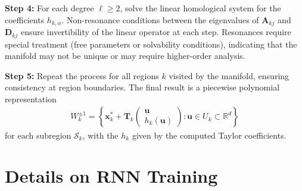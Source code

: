 \documentclass{article}
\theoremstyle{example}
\theoremstyle{plain}
\theoremstyle{definition}
\theoremstyle{remark}
\def\vx{{\bm{x}}}
\def\mA{{\bm{A}}}
\def\mD{{\bm{D}}}
\def\mT{{\bm{T}}}
\begin{document}
\textbf{Step 4:} For each degree $\ell \ge 2$, solve the linear homological system for the coefficients $h_{k,\alpha}$. Non-resonance conditions between the eigenvalues of $\mA_{kj}$ and $\mD_{kj}$ ensure invertibility of the linear operator at each step. Resonances require special treatment (free parameters or solvability conditions), indicating that the manifold may not be unique or may require higher-order analysis.

\textbf{Step 5:} Repeat the process for all regions $k$ visited by the manifold, ensuring consistency at region boundaries. The final result is a piecewise polynomial representation
\begin{align}
W^{\pm1}_k = \left\{ \vx_k^* + \mT_k \begin{pmatrix} \bm{u} \\ h_k(\bm{u}) \end{pmatrix} : \bm{u} \in U_k \subset \mathbb{R}^d \right\}
\end{align}
for each subregion $\mathcal{S}_k$, with the $h_k$ given by the computed Taylor coefficients.

\section{Details on RNN Training}
\label{Method details}
\end{document}
